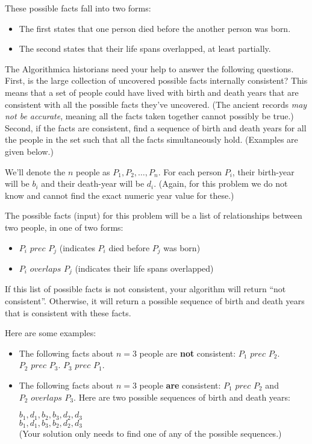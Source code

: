 \documentclass[10pt]{article}
\begin{document}
These possible facts fall into two forms: 
\begin{itemize}
    \item The first states that one person died before the another person was born.
    \item The second states that their life spans overlapped, at least partially. 
\end{itemize} 

The Algorithmica historians need your help to answer the following questions. First, is the large collection of uncovered possible facts internally consistent? This means that a set of people could have lived with birth and death years that are consistent with all the possible facts they've uncovered. (The ancient records \textit{may not be accurate}, meaning all the facts taken together cannot possibly be true.) Second, if the facts are consistent, find a sequence of birth and death years for all the people in the set such that all the facts simultaneously hold. (Examples are given below.)

We'll denote the $n$ people as  $P_1, P_2,\ldots, P_n$. For each person $P_i$, their birth-year will be $b_i$ and their death-year will be $d_i$.  (Again, for this problem we do not know and cannot find the exact numeric year value for these.)

The possible facts (input) for this problem will be a list of relationships between two people, in one of two forms:
\begin{itemize}
\item $P_i \textit{ prec } P_j$ (indicates $P_i$ died before $P_j$ was born)
\item $P_i \textit{ overlaps } P_j$ (indicates their life spans overlapped)
\end{itemize}

If this list of possible facts is not consistent, your algorithm will return ``not consistent''.  Otherwise, it will return a possible sequence of birth and death years that is consistent with these facts.

Here are some examples:
\begin{itemize}

\item The following facts about $n=3$ people are \textbf{not} consistent: 
$P_1 \textit{ prec } P_2$. 
$P_2 \textit{ prec } P_3$. 
$P_3 \textit{ prec } P_1$.

\item The following facts about $n=3$ people \textbf{are} consistent: 
$P_1 \textit{ prec } P_2$ and $P_2 \textit{ overlaps } P_3$. Here are two possible sequences of birth and death years:

\hspace*{2em} $b_1, d_1, b_2, b_3, d_2, d_3$ \\
\hspace*{2em} $b_1, d_1, b_3, b_2, d_2, d_3$ \\
(Your solution only needs to find one of any of the possible sequences.)
\end{itemize}
\end{document}
